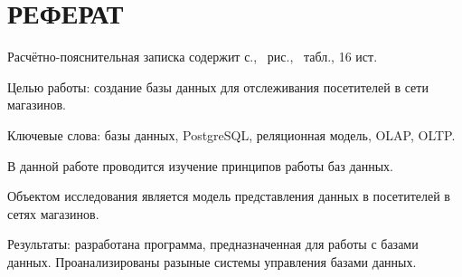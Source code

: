 \section*{\large РЕФЕРАТ}


Расчётно-пояснительная записка содержит \pageref{LastPage} с., \totalfigures\ рис., \totaltables\ табл., 16 ист.

Целью работы: создание базы данных для отслеживания посетителей в сети магазинов.

Ключевые слова: базы данных, PostgreSQL, реляционная модель, OLAP, OLTP.

В данной работе проводится изучение принципов работы баз данных.

Объектом исследования является модель представления данных в посетителей в сетях магазинов.

Результаты: разработана программа, предназначенная для работы с базами данных. Проанализированы разыные системы управления базами данных.

\pagebreak